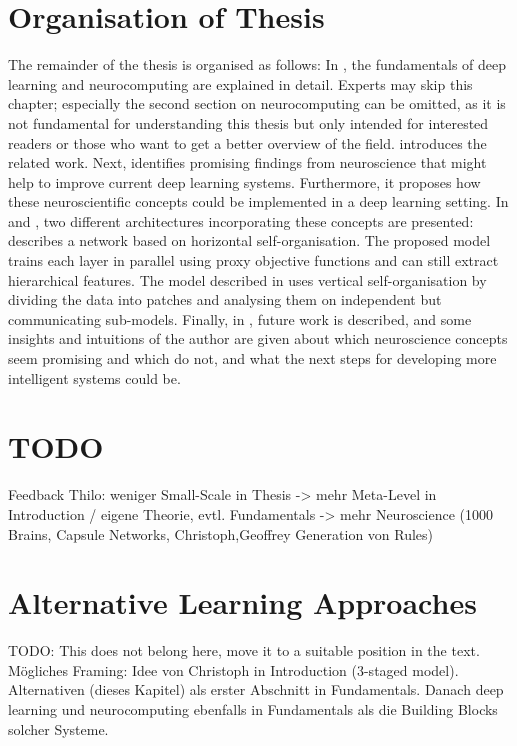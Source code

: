 \section{Organisation of Thesis}
The remainder of the thesis is organised as follows: In , the fundamentals of deep learning and neurocomputing are explained in detail.
Experts may skip this chapter; especially the second section on neurocomputing can be omitted, as it is not fundamental for understanding this thesis but only intended for interested readers or those who want to get a better overview of the field.
 introduces the related work. Next,  identifies promising findings from neuroscience that might help to improve current deep learning systems. Furthermore, it proposes how these neuroscientific concepts could be implemented in a deep learning setting.
In  and , two different architectures incorporating these concepts are presented:
 describes a network based on horizontal self-organisation. The proposed model trains each layer in parallel using proxy objective functions and can still extract hierarchical features.
The model described in  uses vertical self-organisation by dividing the data into patches and analysing them on independent but communicating sub-models.
Finally, in , future work is described, and some insights and intuitions of the author are given about which neuroscience concepts seem promising and which do not, and what the next steps for developing more intelligent systems could be.

\section{TODO}
Feedback Thilo: weniger Small-Scale in Thesis -> mehr Meta-Level in Introduction / eigene Theorie, evtl. Fundamentals -> mehr Neuroscience (1000 Brains, Capsule Networks, Christoph,Geoffrey Generation von Rules)

\section{Alternative Learning Approaches}
TODO: This does not belong here, move it to a suitable position in the text.
Mögliches Framing: Idee von Christoph in Introduction (3-staged model). Alternativen (dieses Kapitel) als erster Abschnitt in Fundamentals. Danach deep learning und neurocomputing ebenfalls in Fundamentals als die Building Blocks solcher Systeme.

